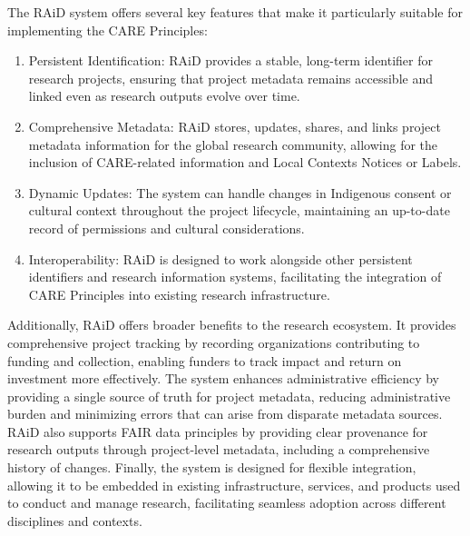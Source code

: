 \documentclass[a0,portrait]{a0poster}
\begin{document}
\begin{multicols}{2}
{The RAiD system offers several key features that make it particularly suitable for implementing the CARE Principles:

\begin{enumerate}
\item Persistent Identification: RAiD provides a stable, long-term identifier for research projects, ensuring that project metadata remains accessible and linked even as research outputs evolve over time.
\item Comprehensive Metadata: RAiD stores, updates, shares, and links project metadata information for the global research community, allowing for the inclusion of CARE-related information and Local Contexts Notices or Labels.
\item Dynamic Updates: The system can handle changes in Indigenous consent or cultural context throughout the project lifecycle, maintaining an up-to-date record of permissions and cultural considerations.
\item Interoperability: RAiD is designed to work alongside other persistent identifiers and research information systems, facilitating the integration of CARE Principles into existing research infrastructure.
\end{enumerate}

Additionally, RAiD offers broader benefits to the research ecosystem. It provides comprehensive project tracking by recording organizations contributing to funding and collection, enabling funders to track impact and return on investment more effectively. The system enhances administrative efficiency by providing a single source of truth for project metadata, reducing administrative burden and minimizing errors that can arise from disparate metadata sources. RAiD also supports FAIR data principles by providing clear provenance for research outputs through project-level metadata, including a comprehensive history of changes. Finally, the system is designed for flexible integration, allowing it to be embedded in existing infrastructure, services, and products used to conduct and manage research, facilitating seamless adoption across different disciplines and contexts.

}


\vspace{2cm}


\end{multicols}
\end{document}
